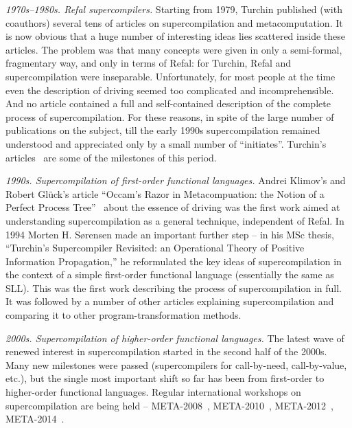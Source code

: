 \begin{longitem}

\item \emph{1970s--1980s. Refal supercompilers.} Starting from 1979, Turchin
published (with coauthors) several tens of articles on supercompilation 
and metacomputation. 
It is now obvious that a huge number of interesting ideas lies scattered 
inside these articles.
The problem was that many concepts were given in only a semi-formal, fragmentary way,
and only in terms of Refal: for Turchin, Refal and supercompilation were inseparable.
Unfortunately, for most people at the time even the description of
driving seemed too complicated and incomprehensible.
And no article contained a full and self-contained description
of the complete process of supercompilation.
For these reasons, in spite of the large number of publications on the subject,
till the early 1990s supercompilation remained understood and appreciated
only by a small number of ``initiates''.
Turchin's articles~\cite{Turchin1974EqTrans,Turchin1980Refal,Turchin1986Supercompiler,Turchin1988Generalization,Turchin1993Transformation,Turchin1996Supercompilation,Turchin1996Metacomputation}
are some of the milestones of this period.

\item \emph{1990s. Supercompilation of first-order functional languages.} Andrei
Klim\-ov's and Robert Gl\"{u}ck's article
``Occam's Razor in Metacompuation: the Notion
of a Perfect Process Tree''~\cite{Gluck1993Occam} about the essence of driving
was the first work aimed at understanding supercompilation as a general technique,
independent of Refal.
In 1994 Morten H. S{\o}rensen made an important further step -- in his MSc thesis,
``Turchin's Supercompiler Revisited: an Operational Theory of Positive Information Propagation,''
\cite{Sorensen1994TurchinSupercompiler}
he reformulated the key ideas of supercompilation in the context of a simple
first-order functional language (essentially the same as SLL).
This was the first work describing the process of supercompilation in full.
It was followed by a number of other articles
\cite{Abramov1995meta,Sorensen1995Generalization,Gluck1996Roadmap,Sorensen1996Positive,Sorensen1998Introduction,Abramov2006meta2}
explaining supercompilation and comparing it to other program-transformation methods.

\item \emph{2000s. Supercompilation of higher-order functional languages.} The latest wave
of renewed interest in supercompilation started in the second half of the 2000s.
Many new milestones were passed (supercompilers for call-by-need, call-by-value, etc.),
but the single most important shift so far has been from first-order to higher-order functional
languages.
Regular international workshops on supercompilation are being held --
META-2008~\cite{Meta2008}, META-2010~\cite{Meta2010}, META-2012~\cite{Meta2012},
META-2014~\cite{Meta2014}.

\end{longitem}

